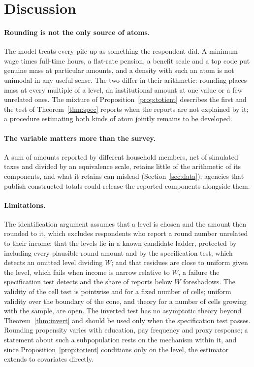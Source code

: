\section{Discussion}\label{sec:disc}

\paragraph{Rounding is not the only source of atoms.}
The model treats every pile-up as something the respondent did. A minimum wage times full-time hours, a flat-rate pension, a benefit scale and a top code put genuine mass at particular amounts, and a density with such an atom is not unimodal in any useful sense. The two differ in their arithmetic: rounding places mass at every multiple of a level, an institutional amount at one value or a few unrelated ones. The mixture of Proposition~\ref{prop:totient} describes the first and the test of Theorem~\ref{thm:spec} reports when the reports are not explained by it; a procedure estimating both kinds of atom jointly remains to be developed.

\paragraph{The variable matters more than the survey.}
A sum of amounts reported by different household members, net of simulated taxes and divided by an equivalence scale, retains little of the arithmetic of its components, and what it retains can mislead (Section~\ref{sec:data}); agencies that publish constructed totals could release the reported components alongside them.

\paragraph{Limitations.}
The identification argument assumes that a level is chosen and the amount then rounded to it, which excludes respondents who report a round number unrelated to their income; that the levels lie in a known candidate ladder, protected by including every plausible round amount and by the specification test, which detects an omitted level dividing $W$; and that residues are close to uniform given the level, which fails when income is narrow relative to $W$, a failure the specification test detects and the share of reports below $W$ foreshadows. The validity of the cell test is pointwise and for a fixed number of cells; uniform validity over the boundary of the cone, and theory for a number of cells growing with the sample, are open. The inverted test has no asymptotic theory beyond Theorem~\ref{thm:invert} and should be used only when the specification test passes. Rounding propensity varies with education, pay frequency and proxy response; a statement about such a subpopulation rests on the mechanism within it, and since Proposition~\ref{prop:totient} conditions only on the level, the estimator extends to covariates directly.
